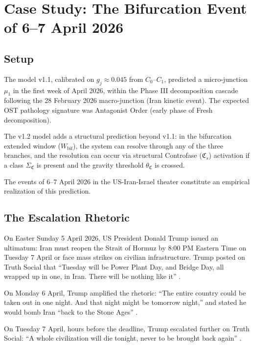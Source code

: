 \documentclass[12pt,a4paper]{article}
\newcommand{\gj}{g_j}
\newcommand{\CFs}{\mathfrak{C}_s}        %
\newcommand{\SigmaCF}{\Sigma_{\mathfrak{C}}}  %
\newcommand{\thetaCF}{\theta_{\mathfrak{C}}}   %
\begin{document}
\section{Case Study: The Bifurcation Event of 6--7 April 2026}\label{sec:case_study}

\subsection{Setup}

The model v1.1, calibrated on $\gj \approx 0.045$ from $C_0$--$C_1$, predicted a micro-junction $\mu_1$ in the first week of April 2026, within the Phase III decomposition cascade following the 28 February 2026 macro-junction (Iran kinetic event). The expected OST pathology signature was Antagonist Order (early phase of Fresh decomposition).

The v1.2 model adds a structural prediction beyond v1.1: in the bifurcation extended window ($W_{\mathrm{bif}}$), the system can resolve through any of the three branches, and the resolution can occur via structural Controfase ($\CFs$) activation if a class $\SigmaCF$ is present and the gravity threshold $\thetaCF$ is crossed.

The events of 6--7 April 2026 in the US-Iran-Israel theater constitute an empirical realization of this prediction.

\subsection{The Escalation Rhetoric}

On Easter Sunday 5 April 2026, US President Donald Trump issued an ultimatum: Iran must reopen the Strait of Hormuz by 8:00 PM Eastern Time on Tuesday 7 April or face mass strikes on civilian infrastructure. Trump posted on Truth Social that ``Tuesday will be Power Plant Day, and Bridge Day, all wrapped up in one, in Iran. There will be nothing like it'' \cite{justsec_war_crimes}.

On Monday 6 April, Trump amplified the rhetoric: ``The entire country could be taken out in one night. And that night might be tomorrow night,'' and stated he would bomb Iran ``back to the Stone Ages'' \cite{intercept_trump}.

On Tuesday 7 April, hours before the deadline, Trump escalated further on Truth Social: ``A whole civilization will die tonight, never to be brought back again'' \cite{intercept_trump}.
\end{document}

